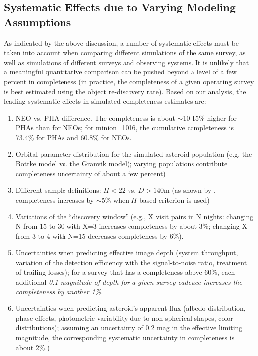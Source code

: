 \subsection{Systematic Effects due to Varying Modeling Assumptions \label{sec:syseff}}

As indicated by the above discussion, a number of systematic effects must be taken into account when
comparing different simulations of the same survey, as well as simulations of different surveys and observing
systems. It is unlikely that a meaningful quantitative comparison can be pushed beyond a level of a few percent
in completeness (in practice, the completeness of a given operating survey is best estimated using the object
re-discovery rate). Based on our analysis, the leading systematic effects in simulated completeness estimates are:
\begin{enumerate}
\item NEO vs. PHA difference. The completeness is about $\sim$10-15\% higher for PHAs than for NEOs;
for minion\_1016, the cumulative completeness is 73.4\% for PHAs and  60.8\% for NEOs.
\item Orbital parameter distribution for the simulated asteroid population (e.g. the Bottke model
             vs. the Granvik model); varying populations contribute completeness uncertainty of about a few percent)
\item Different sample definitions: $H<22$ vs. $D>140$m (as shown by \citealt{GMS2016}, completeness
           increases by $\sim$5\% when $H$-based criterion is used)
\item Variations of the ``discovery window'' (e.g., X visit pairs in N nights: changing N from 15 to 30 with X=3 increases
          completeness by about 3\%; changing X from 3 to 4 with N=15 decreases completeness by 6\%).
\item Uncertainties when predicting effective image depth (system throughput, variation of the detection efficiency
          with the signal-to-noise ratio, treatment of trailing losses); for a survey that has a completeness above 60\%,
          each additional {\it 0.1 magnitude of depth for a given survey cadence increases the completeness by another 1\%}.
\item Uncertainties when predicting asteroid's apparent flux (albedo distribution, phase effects, photometric variability
          due to non-spherical shapes, color distributions); assuming an uncertainty of 0.2 mag in the effective
          limiting magnitude, the corresponding  systematic uncertainty in completeness is about 2\%.)

\end{enumerate}
